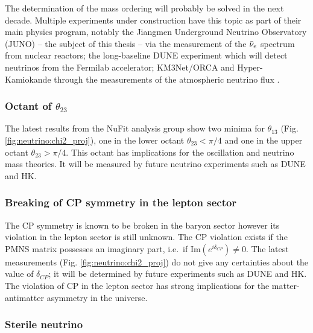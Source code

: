 \documentclass[../main.tex]{subfiles}
\begin{document}
The determination of the mass ordering will probably be solved in the next decade. Multiple experiments under construction have this topic as part of their main physics program, notably the Jiangmen Underground Neutrino Observatory (JUNO) \cite{juno_collaboration_juno_2022} -- the subject of this thesis -- via the measurement of the $\bar{\nu}_{e}$ spectrum from nuclear reactors; the long-baseline DUNE experiment \cite{abi_long-baseline_2020} which will detect neutrinos from the Fermilab accelerator; KM3Net/ORCA and Hyper-Kamiokande through the measurements of the atmospheric neutrino flux \cite{aiello_determining_2021, abe_hyper-kamiokande_2018}.

\subsubsection{Octant of $\theta_{23}$}

The latest results from the NuFit analysis group \cite{esteban_nufit-60_2024} show two minima for $\theta_{13}$ (Fig. \ref{fig:neutrino:chi2_proj}), one in the lower octant $\theta_{23} < \pi/4$ and one in the upper octant $\theta_{23} > \pi/4$. This octant has implications for the oscillation and neutrino mass theories. It will be measured by future neutrino experiments such as DUNE and HK.

\subsubsection{Breaking of CP symmetry in the lepton sector}

The CP symmetry is known to be broken in the baryon sector \cite{christenson_evidence_1964} however its violation in the lepton sector is still unknown. The CP violation exists if the PMNS matrix possesses an imaginary part, i.e.\ if $\text{Im}(e^{i\delta_{CP}}) \neq 0$. The latest measurements (Fig. \ref{fig:neutrino:chi2_proj}) do not give any certainties about the value of $\delta_{CP}$; it will be determined by future experiments such as DUNE and HK. The violation of CP in the lepton sector has strong implications for the matter-antimatter asymmetry in the universe.

\subsubsection{Sterile neutrino}
\end{document}

